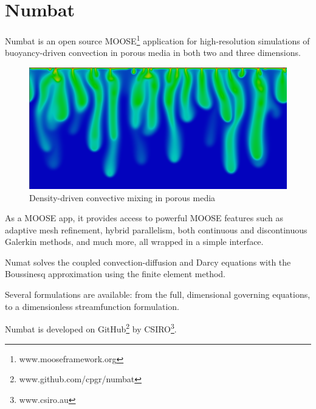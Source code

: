 \documentclass[12pt, a4paper, midday, formal]{csiroreport2017}
\begin{document}
\clearpage
\listoffigures
\clearpage
{}

%
%
\section{Numbat}

Numbat is an open source MOOSE\footnote{www.mooseframework.org} application for high-resolution simulations of buoyancy-driven convection in porous media in both two and three dimensions.

\begin{figure}[ht]
\begin{center}
\includegraphics[width=\textwidth]{../content/media/convection.png}
\caption{Density-driven convective mixing in porous media}
\label{fig:convection}
\end{center}
\end{figure}

As a MOOSE app, it provides access to powerful MOOSE features such as adaptive mesh refinement, hybrid parallelism, both continuous and discontinuous Galerkin methods, and much more, all wrapped in a simple interface.

Numat solves the coupled convection-diffusion and Darcy equations with the Boussinesq approximation using the finite element method.

Several formulations are available: from the full, dimensional governing equations, to a dimensionless streamfunction formulation.

Numbat is developed on GitHub\footnote{www.github.com/cpgr/numbat} by CSIRO\footnote{www.csiro.au}.

%
%









%
%
\clearpage


\end{document}
